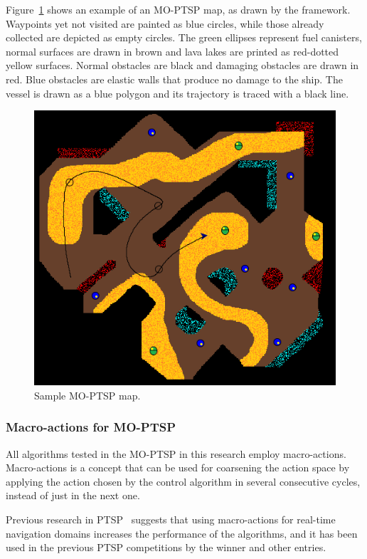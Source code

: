 \documentclass[journal]{IEEEtran}
\begin{document}
Figure~\ref{fig:sampleMap} shows an example of an MO-PTSP map, as drawn by the framework. Waypoints yet not visited are painted as blue circles, while those already collected are depicted as empty circles. The green ellipses represent fuel canisters, normal surfaces are drawn in brown and lava lakes are printed as red-dotted yellow surfaces. Normal obstacles are black and damaging obstacles are drawn in red. Blue obstacles are elastic walls that produce no damage to the ship. The vessel is drawn as a blue polygon and its trajectory is traced with a black line.

\begin{figure} [!t]
	\begin{center}
	\includegraphics[width=0.8\columnwidth]{img/moptspmap}
	\caption{Sample MO-PTSP map.}
	\label{fig:sampleMap}
	\end{center}
\end{figure}

\subsubsection{Macro-actions for MO-PTSP} \label{sssec:macro}

All algorithms tested in the MO-PTSP in this research employ macro-actions. Macro-actions is a concept that can be used for coarsening the action space by applying the action chosen by the control algorithm in several consecutive cycles, instead of just in the next one. 

Previous research in PTSP~\cite{Perez2013, Perez2012} suggests that using macro-actions for real-time navigation domains increases the performance of the algorithms, and it has been used in the previous PTSP competitions by the winner and other entries.
\end{document}
